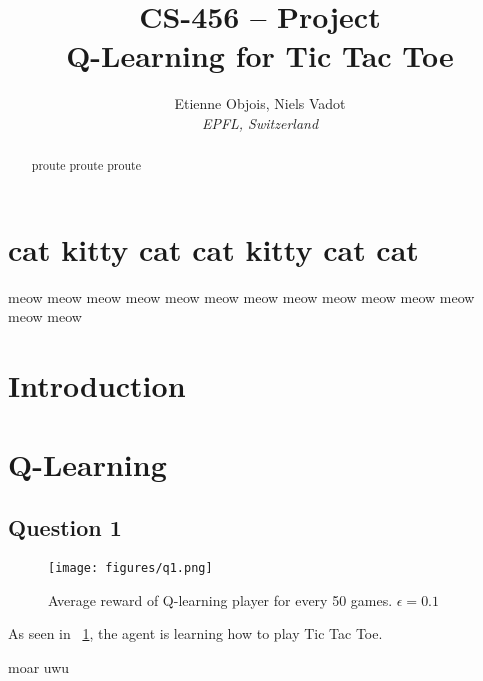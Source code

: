 \documentclass[10pt,conference,compsocconf,a4paper]{IEEEtran}
\begin{document}
\title{CS-456 -- Project\\Q-Learning for Tic Tac Toe}

\author{
	Etienne Objois, Niels Vadot\\
	\textit{EPFL, Switzerland}
}

\maketitle

\begin{abstract}
	proute proute proute
\end{abstract}

\section{cat kitty cat cat kitty cat cat}

	meow meow meow meow meow meow meow meow meow meow meow meow meow meow 
	\cite{cs456_source}
\section{Introduction}
\section{Q-Learning}
\subsection*{Question 1}

\begin{figure}
	\caption{Average reward of Q-learning player for every 50 games. $\epsilon = 0.1$}

	\texttt{[image: figures/q1.png]}
	\label{figure:q1}
\end{figure}

As seen in ~\ref{figure:q1}, the agent is learning how to play Tic Tac Toe.

\newpage



\newpage
\appendix

	moar uwu
\end{document}
